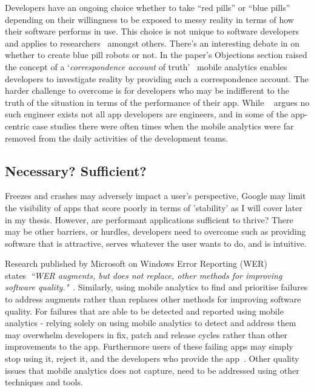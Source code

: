 Developers have an ongoing choice whether to take ``red pills'' or ``blue pills''~ depending on their willingness to be exposed to messy reality in terms of how their software performs in use. This choice is not unique to software developers and applies to researchers~ amongst others. There's an interesting debate in  on whether to create blue pill robots or not. In the paper's Objections section raised the concept of a `\textit{correspondence account} of truth'~ mobile analytics enables developers to investigate reality by providing such a correspondence account. The harder challenge to overcome is for developers who may be indifferent to the truth of the situation in terms of the performance of their app. While ~ argues no such engineer exists not all app developers are engineers, and in some of the app-centric case studies there were often times when the mobile analytics were far removed from the daily activities of the development teams.

\subsection{Necessary? Sufficient?}
Freezes and crashes may adversely impact a user's perspective, Google may limit the visibility of apps that score poorly in terms of 'stability' as I will cover later in my thesis. However, are performant applications sufficient to thrive? There may be other barriers, or hurdles, developers need to overcome such as providing software that is attractive, serves whatever the user wants to do, and is intuitive.

Research published by Microsoft on Windows Error Reporting (WER) states~\emph{``WER augments, but does not replace, other methods for improving software quality."}~. Similarly, using mobile analytics to find and prioritise failures to address augments rather than replaces other methods for improving software quality. For failures that are able to be detected and reported using mobile analytics - relying solely on using mobile analytics to detect and address them may overwhelm developers in fix, patch and release cycles rather than other improvements to the app. Furthermore users of these failing apps may simply stop using it, reject it, and the developers who provide the app~. Other quality issues that mobile analytics does not capture, need to be addressed using other techniques and tools.

